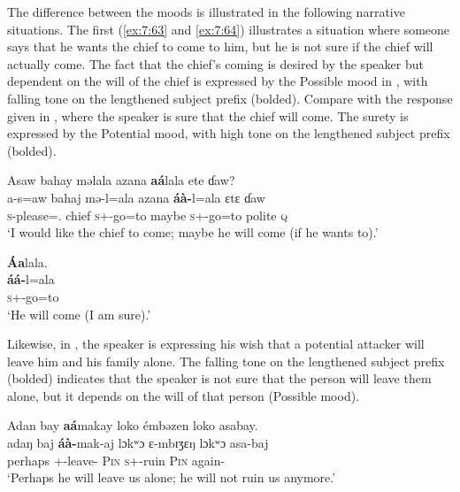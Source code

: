 The difference between the moods is illustrated in the following narrative situations. The first (\ref{ex:7:63} and \ref{ex:7:64}) illustrates a situation where someone says that he wants the chief to come to him, but he is not sure if the chief will actually come. The fact that the chief’s coming is desired by the speaker but dependent on the will of the chief is expressed by the Possible mood in , with falling tone on the lengthened subject prefix (bolded). Compare with the response given in , where the speaker is sure that the chief will come. The surety is expressed by the Potential mood, with high tone on the lengthened subject prefix (bolded). 

\ea\label{ex:7:63}
Asaw  bahay  məlala azana  \textbf{aá}lala  ete  ɗaw?\\
\gll  a-s=aw  bahaj  mə-l=ala azana  \textbf{áà-}l=ala  ɛtɛ  ɗaw\\
      \textsc{s}-please={\oneS}.{\IO}  chief  \textsc{s}+{\HOR}-go=to  maybe  \textsc{s}+{\PBL}{}-go=to  polite  {\textsc{q}}\\
\glt  ‘I would like the chief to come; maybe he will come (if he wants to).’\\
\z  

\ea\label{ex:7:64}
\textbf{Áa}lala.\\
\gll \textbf{áá-}l=ala\\
      \textsc{s}+{\POT}-go=to\\
\glt  ‘He will come (I am sure).’\\
\z 

Likewise, in , the speaker is expressing his wish that a potential attacker will leave him and his family alone. The falling tone on the lengthened subject prefix (bolded) indicates that the speaker is not sure that the person will leave them alone, but it depends on the will of that person (Possible mood). 

\ea\label{ex:7:65}
Adan  bay  \textbf{aá}makay  loko  émbəzen  loko  asabay.\\
\gll  adaŋ  baj  \textbf{áà-}mak-aj    lɔkʷɔ  ɛ{}-mbɪʒɛŋ  lɔkʷɔ  asa-baj\\
      perhaps  {\NEG}  {\twoS}+{\PBL}{}-leave{}-{\CL}  \textsc{Pin}  \textsc{s}+{\IFV}-ruin  \textsc{Pin}  again-{\NEG}\\
\glt  ‘Perhaps he will leave us alone; he will not ruin us anymore.’\\
\z 

